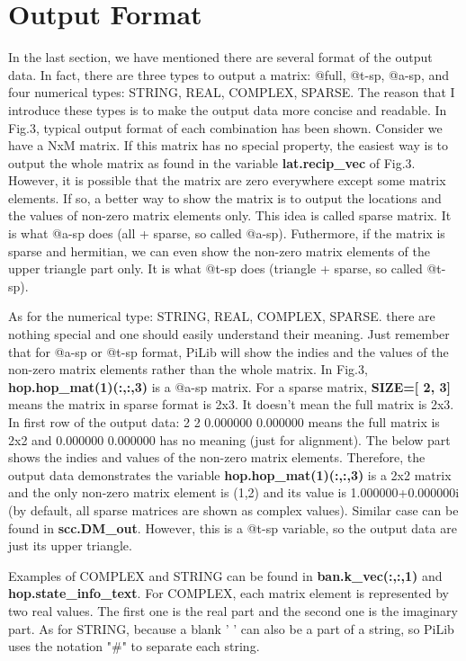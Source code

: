 \documentclass[10pt,a4paper]{article}
\begin{document}
\section{Output Format}
In the last section, we have mentioned there are several format of the output data. In fact, there are three types to output a matrix: @full, @t-sp, @a-sp, and four numerical types: STRING, REAL, COMPLEX, SPARSE. The reason that I introduce these types is to make the output data more concise and readable. In Fig.3, typical output format of each combination has been shown. Consider we have a NxM matrix. If this matrix has no special property, the easiest way is to output the whole matrix as found in the variable \textbf{lat.recip\_vec} of Fig.3. However, it is possible that the matrix are zero everywhere except some matrix elements. If so, a better way to show the matrix is to output the locations and the values of non-zero matrix elements only. This idea is called sparse matrix. It is what @a-sp does (all + sparse, so called @a-sp). Futhermore, if the matrix is sparse and hermitian, we can even show the non-zero matrix elements of the upper triangle part only. It is what @t-sp does (triangle + sparse, so called @t-sp).

As for the numerical type: STRING, REAL, COMPLEX, SPARSE. there are nothing special and one should easily understand their meaning. Just remember that for @a-sp or @t-sp format, PiLib will show the indies and the values of the non-zero matrix elements rather than the whole matrix. In Fig.3, \textbf{hop.hop\_mat(1)(:,:,3)} is a @a-sp matrix. For a sparse matrix, \textbf{SIZE=[ 2, 3]} means the matrix in sparse format is 2x3. It doesn't mean the full matrix is 2x3. In first row of the output data: 2 2 0.000000 0.000000 means the full matrix is 2x2 and 0.000000 0.000000 has no meaning (just for alignment). The below part shows the indies and values of the non-zero matrix elements. Therefore, the output data demonstrates the variable \textbf{hop.hop\_mat(1)(:,:,3)} is a 2x2 matrix and the only non-zero matrix element is (1,2) and its value is 1.000000+0.000000i (by default, all sparse matrices are shown as complex values). Similar case can be found in \textbf{scc.DM\_out}. However, this is a @t-sp variable, so the output data are just its upper triangle.

Examples of COMPLEX and STRING can be found in \textbf{ban.k\_vec(:,:,1)} and \textbf{hop.state\_info\_text}. For COMPLEX, each matrix element is represented by two real values. The first one is the real part and the second one is the imaginary part. As for STRING, because a blank '   ' can also be a part of a string, so PiLib uses the notation "\#" to separate each string.  
  
\end{document}
